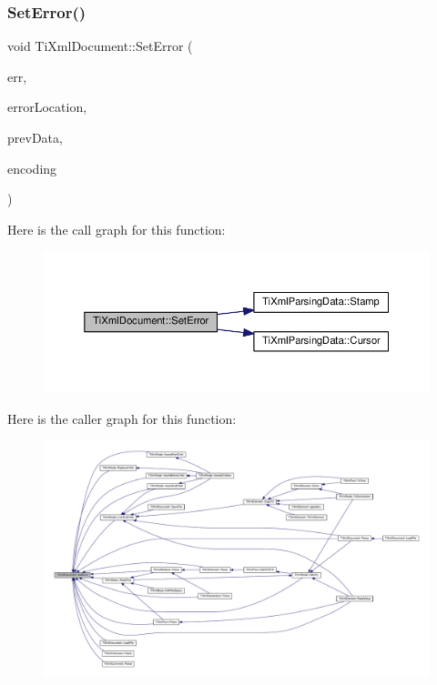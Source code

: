\subsubsection{\texorpdfstring{Set\+Error()}{SetError()}}
{\footnotesize\ttfamily void Ti\+Xml\+Document\+::\+Set\+Error (\begin{DoxyParamCaption}\item[{int}]{err,  }\item[{const char $\ast$}]{error\+Location,  }\item[{\hyperlink{class_ti_xml_parsing_data}{Ti\+Xml\+Parsing\+Data} $\ast$}]{prev\+Data,  }\item[{\hyperlink{tinyxml_8h_a88d51847a13ee0f4b4d320d03d2c4d96}{Ti\+Xml\+Encoding}}]{encoding }\end{DoxyParamCaption})}

Here is the call graph for this function\+:\nopagebreak
\begin{figure}[H]
\begin{center}
\leavevmode
\includegraphics[width=350pt]{class_ti_xml_document_a735c23e318597b920c94eae77fa206de_cgraph}
\end{center}
\end{figure}
Here is the caller graph for this function\+:\nopagebreak
\begin{figure}[H]
\begin{center}
\leavevmode
\includegraphics[width=350pt]{class_ti_xml_document_a735c23e318597b920c94eae77fa206de_icgraph}
\end{center}
\end{figure}
\mbox{\label{class_ti_xml_document_a51dac56316f89b35bdb7d0d433ba988e}} 
